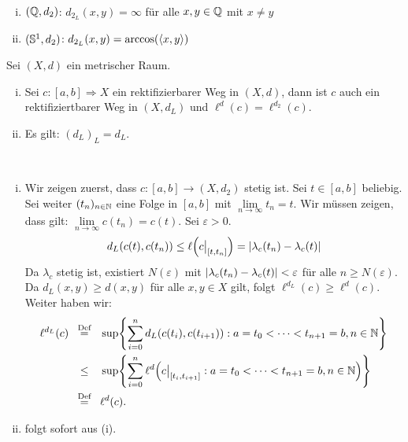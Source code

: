 \begin{beispiel}
\label{bsp:2.10}
	\mbox{} \\[-1.4cm]
	\begin{enumerate}[(i)]
		\item $(\mathbb{Q},d_2)$: $d_{2_L}(x,y) = \infty$ für alle $x,y \in \mathbb{Q}$ mit $x \neq y$
		\item $(\mathbb{S}^1,d_2)$: $d_{2_L}(x,y) = \arccos(\langle x,y\rangle)$
	\end{enumerate}
\end{beispiel}

\begin{proposition}
\label{prop:2.11}
	Sei $(X,d)$ ein metrischer Raum.
	\begin{enumerate}[(i)]
		\item Sei $c \colon [a,b] \Rightarrow X$ ein rektifizierbarer Weg in $(X,d)$, dann ist $c$ auch ein rektifiziertbarer Weg in $(X,d_L)$ und $\ell^d(c) = \ell^{d_2}(c)$.
		\item Es gilt: $(d_L)_L = d_L$.
	\end{enumerate}	
\end{proposition}

\begin{beweis}
	\mbox{} \\[-.9cm]
	\begin{enumerate}[(i)]
		\item Wir zeigen zuerst, dass $c \colon [a,b] \rightarrow (X,d_2)$ stetig ist.
		Sei $t \in [a,b]$ beliebig.
		Sei weiter $(t_n)_{n \in \mathbb{N}}$ eine Folge in $[a,b]$ mit $\lim\limits_{n \rightarrow \infty} t_n = t$. Wir müssen zeigen, dass gilt: $\lim\limits_{n \rightarrow \infty} c(t_n) = c(t)$.
		Sei $\varepsilon > 0$.
		\[
			d_L(c(t),c(t_n)) \leq \ell\enbrace*{c \big|_{[t,t_n]}} = \abs{\lambda_c(t_n) - \lambda_c(t)}
		\]
		Da $\lambda_c$ stetig ist, existiert $N(\varepsilon)$ mit $\lvert\lambda_c(t_n) - \lambda_c(t)\rvert < \varepsilon$ für alle $n \geq N(\varepsilon)$. Da $d_L(x,y) \geq d(x,y)$ für alle $x,y \in X$ gilt, folgt $\ell^{d_L}(c) \geq \ell^d(c)$. Weiter haben wir:
		\begin{align*}
			\ell^{d_L}(c) &\stack{\text{Def}}{=} \sup \penbrace*{\sum\limits_{i=0}^{n} d_L(c(t_i),c(t_{i+1})) : a=t_0 < \dots < t_{n+1} = b, n\in \NN} \\
			&\stack{}{\leq} \sup \penbrace*{\sum\limits_{i=0}^{n} \ell^d \enbrace*{c\big|_{[t_i,t_{i+1}]} : a=t_0 < \dots < t_{n+1} = b, n\in \NN}} \\
			&\stack{\text{Def}}{=} \ell^d(c).
		\end{align*}
		\item folgt sofort aus (i). \qedhere
	\end{enumerate}
\end{beweis}

